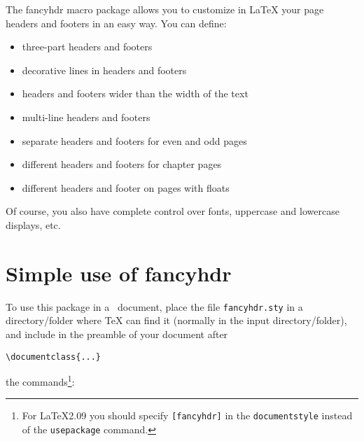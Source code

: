 \documentclass[a4paper]{article}
\makeatletter
\def\latex/{\protect\LaTeX{}}
\def\tex/{\TeX}
\newcommand{\bs}{\symbol{'134}}
\newcommand{\Cmd}[1]{\texttt{\def\{{\char`\{}\def\}{\char`\}}\bs#1}}
\newcommand{\TTindex}[1]{\index{#1@\texttt{#1}}}
\makeatother
\begin{document}
The \textsf{fancyhdr} macro package allows you to customize
in \latex/ your page headers and footers in an easy way.  You can
define:
\begin{itemize}
\item three-part headers and footers
\item decorative lines in headers and footers
\item headers and footers wider than the width of the text
\item multi-line headers and footers
\item separate headers and footers for even and odd pages
\item different headers and footers for chapter pages
\item different headers and footer on pages with floats
\end{itemize}

Of course, you also have complete control over fonts, uppercase
and lowercase displays, etc.



\section{Simple use of \textsf{fancyhdr}}  To use this package in a
\LaTeXe\ document, place the file \verb|fancyhdr.sty| in a
directory/folder where \tex/ can find it (normally in the input
directory/folder), and include in the preamble of your document
after

\begin{verbatim}
\documentclass{...}
\end{verbatim}
the commands\footnote{For LaTeX2.09 you should specify \texttt{[fancyhdr]}
  in the \Cmd{documentstyle} instead of the \Cmd{usepackage}
  command.}:
\end{document}
